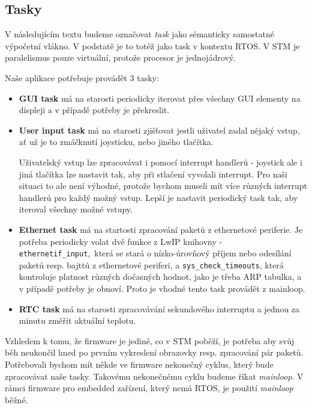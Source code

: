 \subsection{Tasky}

V následujícím textu budeme označovat \emph{task} jako sémanticky samostatné výpočetní
vlákno.
V podstatě je to totéž jako task v kontextu RTOS.
V STM je paralelismus pouze virtuální, protože procesor je jednojádrový.

Naše aplikace potřebuje provádět 3 tasky:
\begin{itemize}
  \item \textbf{GUI task} má na starosti periodicky iterovat přes všechny GUI elementy
    na displeji a v případě potřeby je překreslit.

  \item \textbf{User input task} má na starosti zjišťovat jestli uživatel zadal nějaký
    vstup, ať už je to zmáčknutí joysticku, nebo jiného tlačítka.

    Uživatelský vstup lze zpracovávat i pomocí interrupt handlerů - joystick
    ale i jiná tlačítka lze nastavit tak, aby při stlačení vyvolali interrupt.
    Pro naši situaci to ale není výhodné, protože bychom museli mít více různých
    interrupt handlerů pro každý možný vstup.
    Lepší je nastavit periodický task tak, aby iteroval všechny možné vstupy.

  \item \textbf{Ethernet task} má na startosti zpracování paketů z ethernetové
    periferie. Je potřeba periodicky volat dvě funkce z LwIP knihovny -
    \texttt{ethernetif\_input},~která se stará o nízko-úrovňový příjem nebo odesílání paketů resp.
    bajttů z ethernetové periferi, a \texttt{sys\_check\_timeouts}, která kontroluje platnost různých
    dočasných hodnot, jako je třeba ARP tabulka, a v případě potřeby je obnoví.
    Proto je vhodné tento task provádět z mainloop.

  \item \textbf{RTC task} má na starosti zpracovávání sekundového interruptu a jednou za
    minutu změřit aktuální teplotu.
\end{itemize}

Vzhledem k tomu, že firmware je jediné, co v STM poběží, je potřeba aby svůj běh neukončil
hned po prvním vykreslení obrazovky resp. zpracování pár paketů.
Potřebovali bychom mít někde ve firmware nekonečný cyklus, který bude zpracovávat naše
tasky.
Takovému nekonečnému cyklu budeme říkat \emph{mainloop}.
V rámci firmware pro embedded zařízení, který nemá RTOS, je použití \emph{mainloop} běžné.

